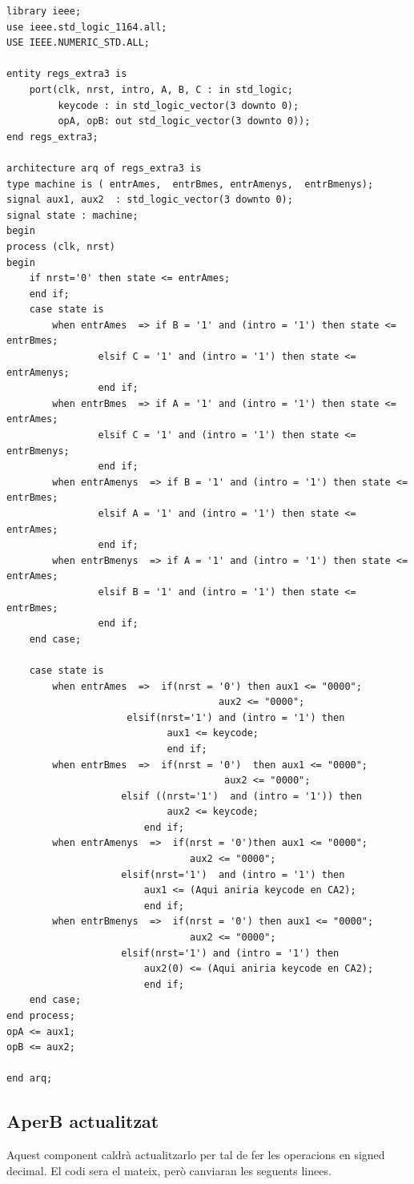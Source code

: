 \documentclass[12pt, a4papre]{article}
\begin{document}
\begin{lstlisting}[style=vhdl, frame=single, basicstyle=\tiny]
library ieee;
use ieee.std_logic_1164.all;
USE IEEE.NUMERIC_STD.ALL;

entity regs_extra3 is
	port(clk, nrst, intro, A, B, C : in std_logic;
		 keycode : in std_logic_vector(3 downto 0);
		 opA, opB: out std_logic_vector(3 downto 0));
end regs_extra3;

architecture arq of regs_extra3 is
type machine is ( entrAmes,  entrBmes, entrAmenys,  entrBmenys);
signal aux1, aux2  : std_logic_vector(3 downto 0);
signal state : machine;
begin
process (clk, nrst)
begin 
	if nrst='0' then state <= entrAmes;
	end if;
	case state is
		when entrAmes  => if B = '1' and (intro = '1') then state <= entrBmes; 
				elsif C = '1' and (intro = '1') then state <= entrAmenys; 
				end if;			  
		when entrBmes  => if A = '1' and (intro = '1') then state <= entrAmes; 
				elsif C = '1' and (intro = '1') then state <= entrBmenys; 
				end if;
		when entrAmenys  => if B = '1' and (intro = '1') then state <= entrBmes; 
				elsif A = '1' and (intro = '1') then state <= entrAmes; 
				end if;	
		when entrBmenys  => if A = '1' and (intro = '1') then state <= entrAmes; 
				elsif B = '1' and (intro = '1') then state <= entrBmes;
				end if;		
	end case;
	
	case state is
		when entrAmes  =>  if(nrst = '0') then aux1 <= "0000"; 
									 aux2 <= "0000";
					 elsif(nrst='1') and (intro = '1') then
							aux1 <= keycode;
							end if;
		when entrBmes  =>  if(nrst = '0')  then aux1 <= "0000"; 
									  aux2 <= "0000";
					elsif ((nrst='1')  and (intro = '1')) then
							aux2 <= keycode;
						end if;
		when entrAmenys  =>  if(nrst = '0')then aux1 <= "0000"; 
								aux2 <= "0000";
					elsif(nrst='1')  and (intro = '1') then
						aux1 <= (Aqui aniria keycode en CA2);
						end if;
		when entrBmenys  =>  if(nrst = '0') then aux1 <= "0000"; 
								aux2 <= "0000";
					elsif(nrst='1') and (intro = '1') then
						aux2(0) <= (Aqui aniria keycode en CA2);
						end if;
	end case;
end process;
opA <= aux1;
opB <= aux2;

end arq;
\end{lstlisting}

\subsection{AperB actualitzat}

Aquest component caldrà actualitzarlo per tal de fer les operacions en signed decimal. El codi sera el mateix, però canviaran les seguents linees.
\end{document}
